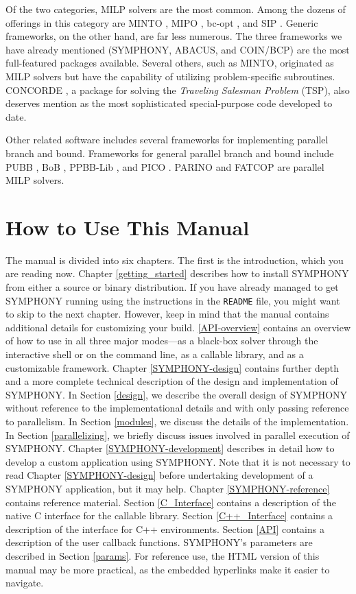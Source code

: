 Of the two categories, MILP solvers are the most common. Among the
dozens of offerings in this category are MINTO \cite{MINTO}, MIPO
\cite{MIPO}, bc-opt \cite{bc-opt}, and SIP \cite{SIP}. Generic
frameworks, on the other hand, are far less numerous. The three
frameworks we have already mentioned (SYMPHONY, ABACUS, and COIN/BCP)
are the most full-featured packages available. Several others, such as
MINTO, originated as MILP solvers but have the capability of utilizing
problem-specific subroutines. CONCORDE \cite{concorde, concorde2}, a
package for solving the {\em Traveling Salesman Problem} (TSP), also
deserves mention as the most sophisticated special-purpose code
developed to date.

Other related software includes several frameworks for implementing
parallel branch and bound. Frameworks for general parallel branch and
bound include PUBB \cite{PUBB}, BoB \cite{BoB}, PPBB-Lib
\cite{PPBB-Lib}, and PICO \cite{PICO}. PARINO \cite{PARINO} and FATCOP
\cite{chen:fatcop2} are parallel MILP solvers.

\section{How to Use This Manual}

The manual is divided into six chapters. The first is the introduction, which
you are reading now. Chapter \ref{getting_started} describes how to install
SYMPHONY from either a source or binary distribution. If you have already
managed to get SYMPHONY running using the instructions in the \texttt{README}
file, you might want to skip to the next chapter. However, keep in mind that
the manual contains additional details for customizing your build.
\ref{API-overview} contains an overview of how to use in all three major
modes---as a black-box solver through the interactive shell or on the command
line, as a callable library, and as a customizable framework. Chapter
\ref{SYMPHONY-design} contains further depth and a more complete technical
description of the design and implementation of SYMPHONY. In Section
\ref{design}, we describe the overall design of SYMPHONY without reference to
the implementational details and with only passing reference to parallelism.
In Section \ref{modules}, we discuss the details of the implementation. In
Section \ref{parallelizing}, we briefly discuss issues involved in parallel
execution of SYMPHONY. Chapter \ref{SYMPHONY-development} describes in detail
how to develop a custom application using SYMPHONY. Note that it is not
necessary to read Chapter \ref{SYMPHONY-design} before undertaking development
of a SYMPHONY application, but it may help. Chapter \ref{SYMPHONY-reference}
contains reference material. Section \ref{C_Interface} contains a description
of the native C interface for the callable library. Section
\ref{C++_Interface} contains a description of the interface for C++
environments. Section \ref{API} contains a description of the user callback
functions. SYMPHONY's parameters are described in Section \ref{params}. For
reference use, the HTML version of this manual may be more practical, as the
embedded hyperlinks make it easier to navigate.
